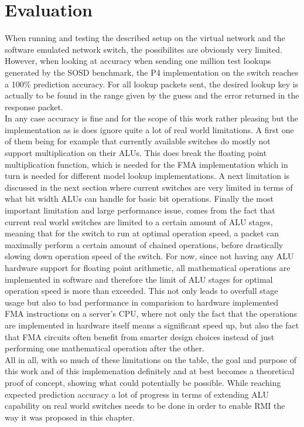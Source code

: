 \section{Evaluation}
\label{sect:rmionbmv2:evaluation}
When running and testing the described setup on the virtual network and the software emulated network switch, the possibilites are obviously very limited. However, when looking at accuracy when sending one million test lookups generated by the SOSD benchmark, the P4 implementation on the switch reaches a 100\% prediction accuracy. For all lookup packets sent, the desired lookup key is actually to be found in the range given by the guess and the error returned in the response packet.\\

In any case accuracy is fine and for the scope of this work rather pleasing but the implementation as is does ignore quite a lot of real world limitations. A first one of them being for example that currently available switches do mostly not support multiplication on their ALUs. This does break the floating point multiplication function, which is needed for the FMA implementation which in turn is needed for different model lookup implementations. A next limitation is discussed in the next section where current switches are very limited in terms of what bit width ALUs can handle for basic bit operations. Finally the most important limitation and large performance issue, comes from the fact that current real world switches are limited to a certain amount of ALU stages, meaning that for the switch to run at optimal operation speed, a packet can maximally perform a certain amount of chained operations, before drastically slowing down operation speed of the switch. For now, since not having any ALU hardware support for floating point arithmetic, all mathematical operations are implemented in software and therefore the limit of ALU stages for optimal operation speed is more than exceeded. This not only leads to overfull stage usage but also to bad performance in comparision to hardware implemented FMA instructions on a server's CPU, where not only the fact that the operations are implemented in hardware itself means a significant speed up, but also the fact that FMA circuits often benefit from smarter design choices instead of just performing one mathematical operation after the other.\\

All in all, with so much of these limitations on the table, the goal and purpose of this work and of this implemenation definitely and at best becomes a theoretical proof of concept, showing what could potentially be possible. While reaching expected prediction accuracy a lot of progress in terms of extending ALU capability on real world switches needs to be done in order to enable RMI the way it was proposed in this chapter.

